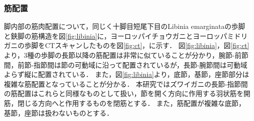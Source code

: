 \subsubsection{筋配置}
脚内部の筋肉配置について，同じく十脚目短尾下目のLibinia emarginataの歩脚と鋏脚の筋構造を図\ref{fig:libinia}に，ヨーロッパイチョウガニとヨーロッパミドリガニの歩脚をCTスキャンしたものを図\ref{fig:ct}，に示す．
図\ref{fig:libinia}，図\ref{fig:ct}より，3種の歩脚の長節以降の筋配置は非常に似ていることが分かり，腕節-前節間，前節-指節間は節の可動域に沿って配置されているが，長節-腕節間は可動域よらず縦に配置されている．
また，図\ref{fig:libinia}より，底節，基節，座節部分は複雑な筋配置となっていることが分かる．
本研究ではズワイガニの長節-指節間の筋配置はこれらと同様なものとして扱い，節を開く方向に作用する羽状筋を開筋，閉じる方向へと作用するものを閉筋とする．
また，筋配置が複雑な底節，基節，座節は扱わないものとする．
  
